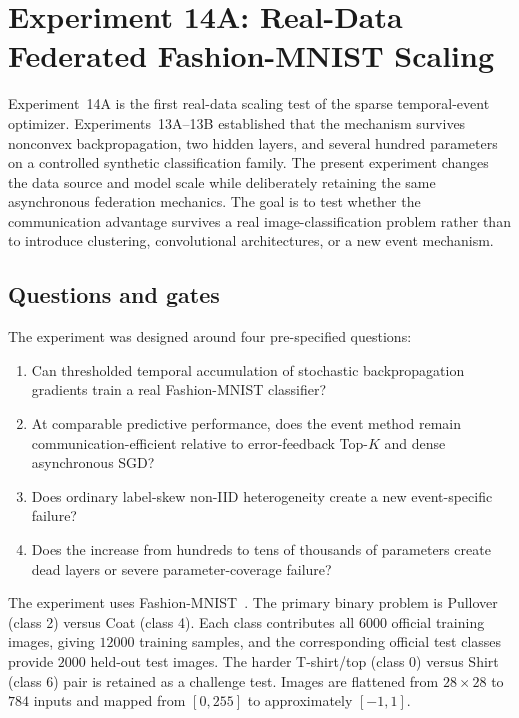 \section{Experiment 14A: Real-Data Federated Fashion-MNIST Scaling}
\label{sec:exp14a}

Experiment~14A is the first real-data scaling test of the sparse temporal-event optimizer. Experiments~13A--13B established that the mechanism survives nonconvex backpropagation, two hidden layers, and several hundred parameters on a controlled synthetic classification family. The present experiment changes the data source and model scale while deliberately retaining the same asynchronous federation mechanics. The goal is to test whether the communication advantage survives a real image-classification problem rather than to introduce clustering, convolutional architectures, or a new event mechanism.

\subsection{Questions and gates}

The experiment was designed around four pre-specified questions:
\begin{enumerate}
    \item Can thresholded temporal accumulation of stochastic backpropagation gradients train a real Fashion-MNIST classifier?
    \item At comparable predictive performance, does the event method remain communication-efficient relative to error-feedback Top-$K$ and dense asynchronous SGD?
    \item Does ordinary label-skew non-IID heterogeneity create a new event-specific failure?
    \item Does the increase from hundreds to tens of thousands of parameters create dead layers or severe parameter-coverage failure?
\end{enumerate}

The experiment uses Fashion-MNIST~\cite{xiao2017fashionmnist}. The primary binary problem is Pullover (class 2) versus Coat (class 4). Each class contributes all $6000$ official training images, giving $12000$ training samples, and the corresponding official test classes provide $2000$ held-out test images. The harder T-shirt/top (class 0) versus Shirt (class 6) pair is retained as a challenge test. Images are flattened from $28\times 28$ to $784$ inputs and mapped from $[0,255]$ to approximately $[-1,1]$.

